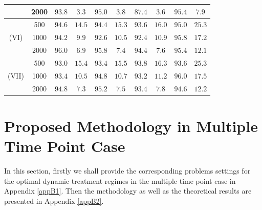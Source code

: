 \documentclass[11pt]{article}
\theoremstyle{referenceplain}
\theoremstyle{referencedefinition}
\theoremstyle{referenceremark}
\begin{document}
\begin{table}[H]
\begin{tabular}{|c|c|c|c|c|c|c|c|c|c|}
        & 2000 & $93.8$ & $3.3$  & $95.0$ & $3.8$  & $87.4$ & $3.6$  & $95.4$ & $7.9$  \\
        \hline
        \multirow{3}{*}{(VI)}
        & 500  & $94.6$ & $14.5$ & $94.4$ & $15.3$ & $93.6$ & $16.0$ & $95.0$ & $25.3$ \\
        & 1000 & $94.2$ & $9.9$  & $92.6$ & $10.5$ & $92.4$ & $10.9$ & $95.8$ & $17.2$ \\
        & 2000 & $96.0$ & $6.9$  & $95.8$ & $7.4$  & $94.4$ & $7.6$  & $95.4$ & $12.1$ \\
        \hline
        \multirow{3}{*}{(VII)}
        & 500  & $93.0$ & $15.4$ & $93.4$ & $15.5$ & $93.8$ & $16.3$ & $93.6$ & $25.3$ \\
        & 1000 & $93.4$ & $10.5$ & $94.8$ & $10.7$ & $93.2$ & $11.2$ & $96.0$ & $17.5$ \\
        & 2000 & $94.8$ & $7.3$  & $95.2$ & $7.5$  & $93.4$ & $7.8$  & $94.6$ & $12.2$ \\
        \hline
    \end{tabular}
    \label{heter-sim}
\end{table}
\section{Proposed Methodology in Multiple Time Point Case}\label{appB}
In this section, firstly we shall provide the corresponding problems settings for the optimal dynamic treatment regimes in the multiple time point case in Appendix \ref{appB1}. Then the methodology as well as the theoretical results are presented in Appendix \ref{appB2}.
\end{document}
